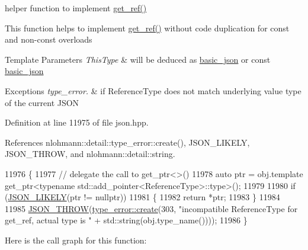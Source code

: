 helper function to implement \hyperlink{classnlohmann_1_1basic__json_afbd800010b67619463c0fce6e74f7878}{get\+\_\+ref()} 

This function helps to implement \hyperlink{classnlohmann_1_1basic__json_afbd800010b67619463c0fce6e74f7878}{get\+\_\+ref()} without code duplication for const and non-\/const overloads


\begin{DoxyTemplParams}{Template Parameters}
{\em This\+Type} & will be deduced as {\ttfamily \hyperlink{classnlohmann_1_1basic__json}{basic\+\_\+json}} or {\ttfamily const \hyperlink{classnlohmann_1_1basic__json}{basic\+\_\+json}}\\
\hline
\end{DoxyTemplParams}

\begin{DoxyExceptions}{Exceptions}
{\em type\+\_\+error.} & if Reference\+Type does not match underlying value type of the current J\+S\+ON \\
\hline
\end{DoxyExceptions}


Definition at line 11975 of file json.\+hpp.



References nlohmann\+::detail\+::type\+\_\+error\+::create(), J\+S\+O\+N\+\_\+\+L\+I\+K\+E\+LY, J\+S\+O\+N\+\_\+\+T\+H\+R\+OW, and nlohmann\+::detail\+::string.


\begin{DoxyCode}
11976     \{
11977         \textcolor{comment}{// delegate the call to get\_ptr<>()}
11978         \textcolor{keyword}{auto} ptr = obj.template get\_ptr<typename std::add\_pointer<ReferenceType>::type>();
11979 
11980         \textcolor{keywordflow}{if} (\hyperlink{json_8hpp_a41ecd1c4cf7c3d56477b9b685b5daa72}{JSON\_LIKELY}(ptr != \textcolor{keyword}{nullptr}))
11981         \{
11982             \textcolor{keywordflow}{return} *ptr;
11983         \}
11984 
11985         \hyperlink{json_8hpp_a6c274f6db2e65c1b66c7d41b06ad690f}{JSON\_THROW}(\hyperlink{classnlohmann_1_1detail_1_1type__error_aecc083aea4b698c33d042670ba50c10f}{type\_error::create}(303, \textcolor{stringliteral}{"incompatible ReferenceType for
       get\_ref, actual type is "} + std::string(obj.type\_name())));
11986     \}
\end{DoxyCode}
Here is the call graph for this function\+:
\mbox{\label{classnlohmann_1_1basic__json_a0136728f5db69d4051c77b94307abd6c}} 
